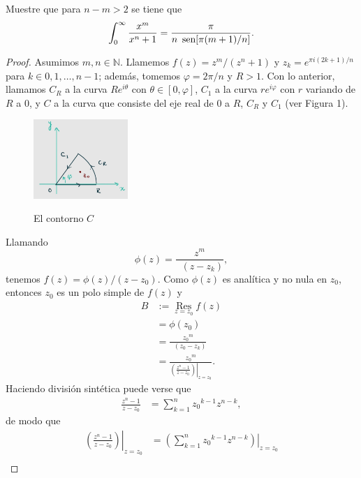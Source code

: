 \begin{Ejc}
   Muestre que para $n-m>2$ se tiene que $$\int_{0}^{\infty}\frac{x^m}{x^n+1}=\frac{\pi}{n \phantom{o}\sen[\pi(m+1)/n]}.$$
\end{Ejc}
\begin{proof}
   Asumimos $m,n\in\mathbb{N}$. Llamemos $f(z)=z^m/(z^n+1)$ y $z_k=e^{\pi i (2k+1)/n}$ para $k\in{0,1,\dots,n-1}$; además, tomemos $\varphi=2\pi/n$ y $R>1$. Con lo anterior, llamamos $C_R$ a la curva $Re^{i\theta}$ con $\theta\in[0,\varphi]$, $C_1$ a la curva $re^{i\varphi}$ con $r$ variando de $R$ a $0$, y $C$ a la curva que consiste del eje real de $0$ a $R$, $C_R$ y $C_1$ (ver Figura 1).\\
   \begin{figure}
   \begin{center}
       \includegraphics[height=3cm]{Diag1.jpeg}\\
       \caption{El contorno $C$}
    \end{center}
   \end{figure}
   Llamando
   $$
   \phi(z)=\frac{z^m}{\mathop{\prod\limits_{0<k\leq n-1}}(z-z_k)},
   $$
   tenemos $f(z)=\phi(z)/(z-z_0)$. Como $\phi(z)$ es analítica y no nula en $z_0$, entonces $z_0$ es un polo simple de $f(z)$ y
   $$
   \begin{aligned}
      B&:=\mathop{\mathrm{Res}}\limits_{z=z_0}f(z)\\
       &=\phi(z_0)\\
       &=\frac{{z_0}^m}{\mathop{\prod\limits_{0<k\leq n-1}}(z_0-z_k)}\\
       &=\frac{{z_0}^m}{\left.\left( \frac{z^n-1}{z-z_0}\right)\right|_{z=z_0}}.
   \end{aligned}
   $$
   Haciendo división sintética puede verse que
   $$
   \begin{aligned}
      \frac{z^n-1}{z-z_0}&=\sum_{k=1}^{n}{z_0}^{k-1}z^{n-k},
   \end{aligned}
   $$
   de modo que
   $$
   \begin{aligned}
      \left.\left( \frac{z^n-1}{z-z_0}\right)\right|_{z=z_0}&=\left.\left( \sum_{k=1}^{n}{z_0}^{k-1}z^{n-k}\right)\right|_{z=z_0}\\

\end{aligned}$$
\end{proof}

